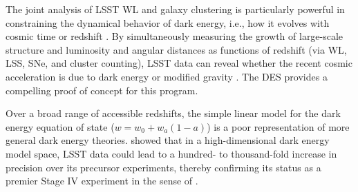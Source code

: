 The joint analysis of LSST WL and galaxy clustering is
particularly powerful in constraining the dynamical behavior of dark
energy, i.e., how it evolves with cosmic time or redshift \citep{2004PhRvD..70D3009H,2006JCAP...08..008Z}.  By
simultaneously measuring the growth of large-scale structure and
luminosity and angular distances as functions of redshift (via WL,
LSS, SNe, and cluster counting), LSST data can reveal whether
the recent cosmic acceleration is due to dark energy or modified
gravity \citep{2004PhRvD..69D4005L,2006PhRvD..74d3513I,2006PhRvD..74B3512K,2008PhRvD..78f3503J,2011PhRvD..83b3008O,2013ApJ...779...39J,2013PhR...530...87W}.
The DES \citep[see, e.g.,][and references therein]{2017arXiv170801530D} provides a compelling proof of concept for this program.

Over a broad range of accessible redshifts, the simple linear model
for the dark energy equation of state ($w = w_0 + w_a(1-a)$) is a poor representation of more
general dark energy theories. \citet{2008PhRvD..78d3528B} showed that in a high-dimensional dark energy model space,
LSST data could lead to a hundred- to thousand-fold increase in precision over its
precursor experiments, thereby confirming its status as
a premier Stage IV experiment in the sense of \citet{2006astro.ph..9591A}.

